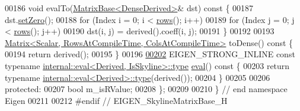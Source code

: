 \begin{DoxyCode}
00186     \textcolor{keywordtype}{void} evalTo(\hyperlink{group___core___module_class_eigen_1_1_matrix_base}{MatrixBase<DenseDerived>}& dst)\textcolor{keyword}{ const }\{
00187         dst.\hyperlink{group___core___module_ac74411ddeea2545bf20baf14613be47e}{setZero}();
00188         \textcolor{keywordflow}{for} (Index i = 0; i < \hyperlink{class_eigen_1_1_skyline_matrix_base_a8243b2fe6bcc6c3037717fcb0afa9d46}{rows}(); i++)
00189             \textcolor{keywordflow}{for} (Index j = 0; j < \hyperlink{class_eigen_1_1_skyline_matrix_base_a8243b2fe6bcc6c3037717fcb0afa9d46}{rows}(); j++)
00190                 dst(i, j) = derived().coeff(i, j);
00191     \}
00192 
00193     \hyperlink{group___core___module_class_eigen_1_1_matrix}{Matrix<Scalar, RowsAtCompileTime, ColsAtCompileTime>}
       toDense()\textcolor{keyword}{ const }\{
00194         \textcolor{keywordflow}{return} derived();
00195     \}
00196 
\hyperlink{class_eigen_1_1_skyline_matrix_base_a03d2346d1bc95c63405e03b6a39d2f7e}{00202}     EIGEN\_STRONG\_INLINE \textcolor{keyword}{const} \textcolor{keyword}{typename} \hyperlink{struct_eigen_1_1internal_1_1eval}{internal::eval<Derived, IsSkyline>::type}
       \hyperlink{class_eigen_1_1_skyline_matrix_base_a03d2346d1bc95c63405e03b6a39d2f7e}{eval}()\textcolor{keyword}{ const }\{
00203         \textcolor{keywordflow}{return} \textcolor{keyword}{typename} \hyperlink{struct_eigen_1_1internal_1_1eval}{internal::eval<Derived>::type}(derived());
00204     \}
00205 
00206 \textcolor{keyword}{protected}:
00207     \textcolor{keywordtype}{bool} m\_isRValue;
00208 \};
00209 
00210 \} \textcolor{comment}{// end namespace Eigen}
00211 
00212 \textcolor{preprocessor}{#endif // EIGEN\_SkylineMatrixBase\_H}
\end{DoxyCode}
